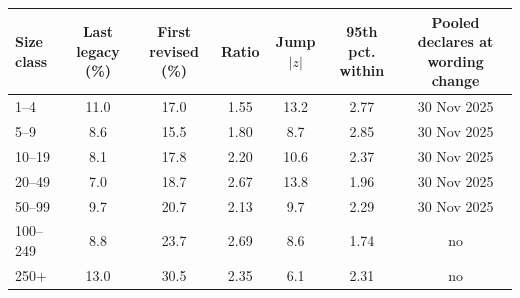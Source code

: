 \begin{tabular}{lcccccc}
\toprule
Size class & Last legacy (\%) & First revised (\%) & Ratio & Jump $|z|$ & 95th pct. within & Pooled declares at wording change \\
\midrule
1--4 & 11.0 & 17.0 & 1.55 & 13.2 & 2.77 & 30 Nov 2025 \\
5--9 & 8.6 & 15.5 & 1.80 & 8.7 & 2.85 & 30 Nov 2025 \\
10--19 & 8.1 & 17.8 & 2.20 & 10.6 & 2.37 & 30 Nov 2025 \\
20--49 & 7.0 & 18.7 & 2.67 & 13.8 & 1.96 & 30 Nov 2025 \\
50--99 & 9.7 & 20.7 & 2.13 & 9.7 & 2.29 & 30 Nov 2025 \\
100--249 & 8.8 & 23.7 & 2.69 & 8.6 & 1.74 & no \\
250+ & 13.0 & 30.5 & 2.35 & 6.1 & 2.31 & no \\
\bottomrule
\end{tabular}
